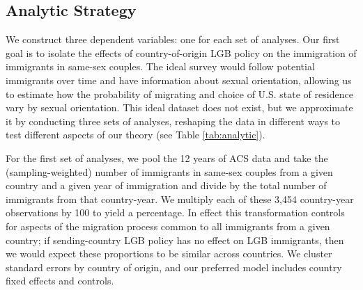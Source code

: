 \documentclass[
  12pt,
]{article}
\begin{document}
\hypertarget{analytic-strategy}{%
\subsection{Analytic Strategy}\label{analytic-strategy}}

We construct three dependent variables: one for each set of analyses. Our first goal is to isolate the effects of country-of-origin LGB policy on the immigration of immigrants in same-sex couples. The ideal survey would follow potential immigrants over time and have information about sexual orientation, allowing us to estimate how the probability of migrating and choice of U.S. state of residence vary by sexual orientation. This ideal dataset does not exist, but we approximate it by conducting three sets of analyses, reshaping the data in different ways to test different aspects of our theory (see Table \ref{tab:analytic}).

For the first set of analyses, we pool the 12 years of ACS data and take the (sampling-weighted) number of immigrants in same-sex couples from a given country and a given year of immigration and divide by the total number of immigrants from that country-year. We multiply each of these 3,454 country-year observations by 100 to yield a percentage. In effect this transformation controls for aspects of the migration process common to all immigrants from a given country; if sending-country LGB policy has no effect on LGB immigrants, then we would expect these proportions to be similar across countries. We cluster standard errors by country of origin, and our preferred model includes country fixed effects and controls.

\providecommand{\docline}[3]{\noalign{\global\setlength{\arrayrulewidth}{#1}}\arrayrulecolor[HTML]{#2}\cline{#3}}

\setlength{\tabcolsep}{2pt}

\renewcommand*{\arraystretch}{1.5}
\end{document}
